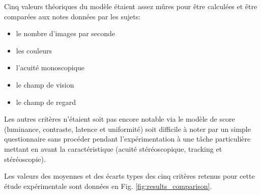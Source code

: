 	\par Cinq valeurs théoriques du modèle étaient assez mûres pour être calculées et être comparées aux notes données par les sujets:
	\begin{itemize}
		\item le nombre d'images par seconde
		\item les couleurs
		\item l'acuité monoscopique
		\item le champ de vision
		\item le champ de regard
	\end{itemize}		
	
	\par Les autres critères n'étaient soit pas encore notable via le modèle de score (luminance, contraste, latence et uniformité) soit difficile à noter par un simple questionnaire sans procéder pendant l'expérimentation à une tâche particulière mettant en avant la caractéristique (acuité stéréoscopique, tracking et stéréoscopie).
	
	\par Les valeurs des moyennes et des écarts types des cinq critères retenus pour cette étude expérimentale sont données en Fig. \ref{fig:results_comparison}.
	

